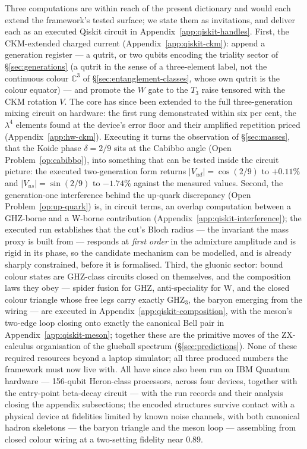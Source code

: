Three computations are within reach of the present dictionary and would each extend the framework's
tested surface; we state them as invitations, and deliver each as an executed Qiskit circuit in
Appendix~\ref{app:qiskit-handles}. First, the CKM-extended charged current
(Appendix~\ref{app:qiskit-ckm}): append a
generation register --- a qutrit, or two qubits encoding the triality sector of
\S\ref{sec:generations} (a qutrit in the sense of a three-element label, not the continuous colour
$\mathbb{C}^3$ of \S\ref{sec:entanglement-classes}, whose own qutrit is the colour equator) --- and
promote the $W$ gate to the $T_3$ raise tensored with the CKM
rotation $V$. The core has since been extended to the full three-generation mixing circuit on hardware:
the first rung demonstrated within six per cent, the $\lambda^{4}$ elements found at the
device's error floor and their amplified repetition priced (Appendix~\ref{app:hw-ckm}). Executing it turns the observation of \S\ref{sec:masses}, that the Koide phase
$\delta = 2/9$ sits at the Cabibbo angle (Open Problem~\ref{op:cabibbo}), into something that can be
tested inside the circuit picture: the executed two-generation form returns
$\lvert V_{ud}\rvert = \cos(2/9)$ to $+0.11\%$ and $\lvert V_{us}\rvert = \sin(2/9)$ to $-1.74\%$
against the measured values. Second, the generation-one interference
behind the up-quark discrepancy (Open Problem~\ref{op:up-quark}) is, in circuit terms, an overlap
computation between a GHZ-borne and a W-borne contribution
(Appendix~\ref{app:qiskit-interference}); the executed run establishes that the cut's Bloch radius
--- the invariant the mass proxy is built from --- responds at \emph{first order} in the admixture
amplitude and is rigid in its phase, so the candidate mechanism can be modelled, and is already
sharply constrained, before it is formalised. Third, the gluonic sector: bound colour states are
GHZ-class circuits closed on themselves, and the composition laws they obey --- spider fusion for
GHZ, anti-speciality for W, and the closed colour triangle whose free legs carry exactly
$\mathrm{GHZ}_3$, the baryon emerging from the wiring --- are executed in
Appendix~\ref{app:qiskit-composition}, with the meson's two-edge loop closing onto exactly the
canonical Bell pair in Appendix~\ref{app:qiskit-meson}; together these are the
primitive moves of the ZX-calculus organisation of the
glueball spectrum (\S\ref{sec:predictions}). None of these required resources beyond a laptop
simulator; all three produced numbers the framework must now live with. All have since also
been run on IBM Quantum hardware --- 156-qubit Heron-class processors, across four devices, together
with the entry-point beta-decay circuit --- with the run records and their analysis closing the
appendix subsections; the encoded structures survive contact with a physical device at fidelities
limited by known noise channels, with both canonical hadron skeletons --- the baryon triangle and
the meson loop --- assembling from closed colour wiring at a two-setting fidelity near $0.89$.

